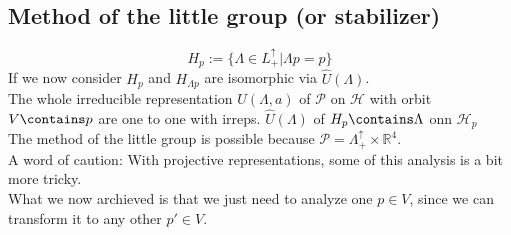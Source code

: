 \documentclass{report}
\begin{document}
\subsection{Method of the little group (or stabilizer)}
\[
  H_p := \{ \Lambda \in L_+^\uparrow | \Lambda p = p\}
\] 
If we now consider $H_p$ and $H_{\Lambda p}$ are isomorphic via $\hat{U}\left( \Lambda \right) $.\\
The whole irreducible representation $U\left( \Lambda,a \right) $ of $\mathcal{P}$ on $\mathcal{H}$ with orbit $V \contains p$ are one to one with irreps. $\hat{U}\left( \Lambda \right) $ of $H_p \contains \Lambda$ onn $\mathcal{H}_p$ \\
The method of the little group is possible because  $\mathcal{P} = \Lambda_+^\uparrow \times \mathbb{R}^4$.\\
A word of caution: With projective representations, some of this analysis is a bit more tricky.\\
What we now archieved is that we just need to analyze one  $p \in V$, since we can transform it to any other $p' \in V$.\\
\end{document}
